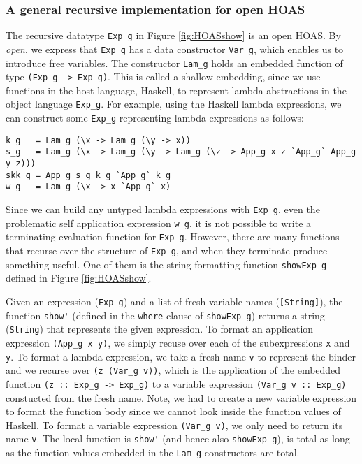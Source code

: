 \documentclass[letterpaper,12pt]{article}
\begin{document}
\subsubsection{A general recursive implementation for open HOAS}
\label{sec:bg:showHOAS:recursive}

The recursive datatype \verb|Exp_g| in Figure \ref{fig:HOASshow}
is an open HOAS. By \emph{open}, we express that \verb|Exp_g| has
a data constructor \verb|Var_g|, which enables us to introduce free variables.
The constructor \verb|Lam_g| holds an embedded function of type
\verb|(Exp_g -> Exp_g)|.
This is called a shallow embedding, since we use functions in the host language,
Haskell, to represent lambda abstractions in the object language \verb|Exp_g|.
For example, using the Haskell lambda expressions,
we can construct some \verb|Exp_g| representing lambda expressions as follows:
\begin{verbatim}
k_g   = Lam_g (\x -> Lam_g (\y -> x))
s_g   = Lam_g (\x -> Lam_g (\y -> Lam_g (\z -> App_g x z `App_g` App_g y z)))
skk_g = App_g s_g k_g `App_g` k_g
w_g   = Lam_g (\x -> x `App_g` x)
\end{verbatim}
Since we can build any untyped lambda expressions with \verb|Exp_g|, 
even the problematic self application expression \verb|w_g|,
it is not possible to write a terminating evaluation function for \verb|Exp_g|.
However, there are many  functions that recurse over the structure of
\verb|Exp_g|, and when they terminate produce something useful.
One of them is the string formatting function \verb|showExp_g| defined in
Figure \ref{fig:HOASshow}.

Given an expression (\verb|Exp_g|) and a list of fresh variable names
(\verb|[String]|), the function \verb|show'| (defined in the \verb|where|
clause of \verb|showExp_g|) returns a string (\verb|String|) that represents
the given expression.  To format an application expression \verb|(App_g x y)|,
we simply recuse over each of the subexpressions \verb|x| and \verb|y|.
To format a lambda expression, we take a fresh name \verb|v| to represent
the binder and we recurse over \verb|(z (Var_g v))|, which is the application of
the embedded function \verb|(z :: Exp_g -> Exp_g)| to a variable expression
\verb|(Var_g v :: Exp_g)| constucted from the fresh name.
Note, we had to create a new variable expression to format the function body
since we cannot look inside the function values of Haskell.
To format a variable expression \verb|(Var_g v)|,
we only need to return its name \verb|v|.  The local function is \verb|show'|
(and hence also \verb|showExp_g|), is total as long as
the function values embedded in the \verb|Lam_g| constructors are total.
\end{document}
